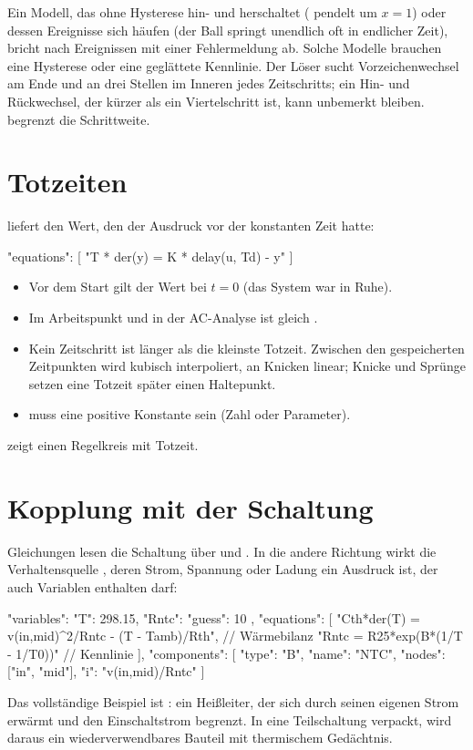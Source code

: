 Ein Modell, das ohne Hysterese hin- und herschaltet
( pendelt um $x = 1$) oder dessen
Ereignisse sich häufen (der Ball springt unendlich oft in endlicher Zeit),
bricht nach  Ereignissen mit einer Fehlermeldung ab.
Solche Modelle brauchen eine Hysterese oder eine geglättete Kennlinie. Der
Löser sucht Vorzeichenwechsel am Ende und an drei Stellen im Inneren jedes
Zeitschritts; ein Hin- und Rückwechsel, der kürzer als ein Viertelschritt
ist, kann unbemerkt bleiben.  begrenzt die Schrittweite.

\section{Totzeiten}
\label{sec:totzeit}

 liefert den Wert, den der Ausdruck  vor der
konstanten Zeit  hatte:

\begin{json}
"equations": [ "T * der(y) = K * delay(u, Td) - y" ]
\end{json}

\begin{itemize}
  \item Vor dem Start gilt der Wert bei $t=0$ (das System war in Ruhe).
  \item Im Arbeitspunkt und in der AC-Analyse ist 
    gleich .
  \item Kein Zeitschritt ist länger als die kleinste Totzeit. Zwischen den
    gespeicherten Zeitpunkten wird kubisch interpoliert, an Knicken linear;
    Knicke und Sprünge setzen eine Totzeit später einen Haltepunkt.
  \item {} muss eine positive Konstante sein (Zahl oder Parameter).
\end{itemize}

 zeigt einen Regelkreis mit
Totzeit.

\section{Kopplung mit der Schaltung}

Gleichungen lesen die Schaltung über  und . In die
andere Richtung wirkt die Verhaltensquelle , deren Strom, Spannung
oder Ladung ein Ausdruck ist, der auch Variablen enthalten darf:

\begin{json}
"variables": { "T": 298.15, "Rntc": { "guess": 10 } },
"equations": [
  "Cth*der(T) = v(in,mid)^2/Rntc - (T - Tamb)/Rth",     // Wärmebilanz
  "Rntc = R25*exp(B*(1/T - 1/T0))"                       // Kennlinie
],
"components": [
  { "type": "B", "name": "NTC", "nodes": ["in", "mid"], "i": "v(in,mid)/Rntc" }
]
\end{json}

Das vollständige Beispiel ist : ein
Heißleiter, der sich durch seinen eigenen Strom erwärmt und den
Einschaltstrom begrenzt. In eine Teilschaltung verpackt, wird daraus ein
wiederverwendbares Bauteil mit thermischem Gedächtnis.
